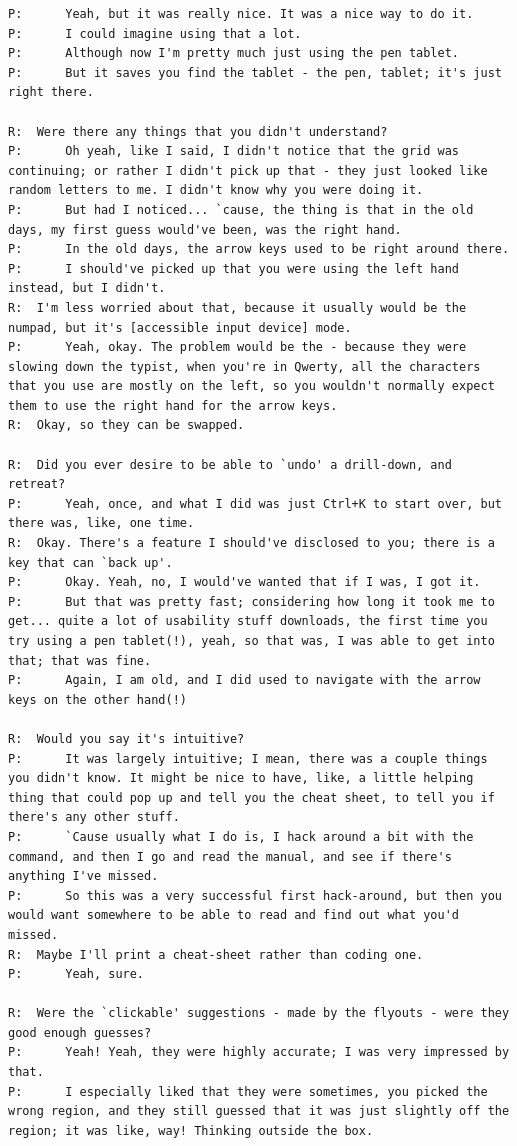 \documentclass[a4paper, 12pt]{report}
\begin{document}
\begin{lstlisting}[caption={Transcript of Usability Study}, label={lst:usabilityTrans}, style=basic, language=custom, flexiblecolumns=true]
P:		Yeah, but it was really nice. It was a nice way to do it.
P:		I could imagine using that a lot.
P:		Although now I'm pretty much just using the pen tablet.
P:		But it saves you find the tablet - the pen, tablet; it's just right there.

R:	Were there any things that you didn't understand?
P:		Oh yeah, like I said, I didn't notice that the grid was continuing; or rather I didn't pick up that - they just looked like random letters to me. I didn't know why you were doing it.
P:		But had I noticed... `cause, the thing is that in the old days, my first guess would've been, was the right hand.
P:		In the old days, the arrow keys used to be right around there.
P:		I should've picked up that you were using the left hand instead, but I didn't.
R:	I'm less worried about that, because it usually would be the numpad, but it's [accessible input device] mode.
P:		Yeah, okay. The problem would be the - because they were slowing down the typist, when you're in Qwerty, all the characters that you use are mostly on the left, so you wouldn't normally expect them to use the right hand for the arrow keys.
R:	Okay, so they can be swapped.

R:	Did you ever desire to be able to `undo' a drill-down, and retreat?
P:		Yeah, once, and what I did was just Ctrl+K to start over, but there was, like, one time.
R:	Okay. There's a feature I should've disclosed to you; there is a key that can `back up'.
P:		Okay. Yeah, no, I would've wanted that if I was, I got it.
P:		But that was pretty fast; considering how long it took me to get... quite a lot of usability stuff downloads, the first time you try using a pen tablet(!), yeah, so that was, I was able to get into that; that was fine.
P:		Again, I am old, and I did used to navigate with the arrow keys on the other hand(!)

R:	Would you say it's intuitive?
P:		It was largely intuitive; I mean, there was a couple things you didn't know. It might be nice to have, like, a little helping thing that could pop up and tell you the cheat sheet, to tell you if there's any other stuff.
P:		`Cause usually what I do is, I hack around a bit with the command, and then I go and read the manual, and see if there's anything I've missed.
P:		So this was a very successful first hack-around, but then you would want somewhere to be able to read and find out what you'd missed.
R:	Maybe I'll print a cheat-sheet rather than coding one.
P:		Yeah, sure.

R:	Were the `clickable' suggestions - made by the flyouts - were they good enough guesses?
P:		Yeah! Yeah, they were highly accurate; I was very impressed by that.
P:		I especially liked that they were sometimes, you picked the wrong region, and they still guessed that it was just slightly off the region; it was like, way! Thinking outside the box.


\end{lstlisting}
\end{document}
